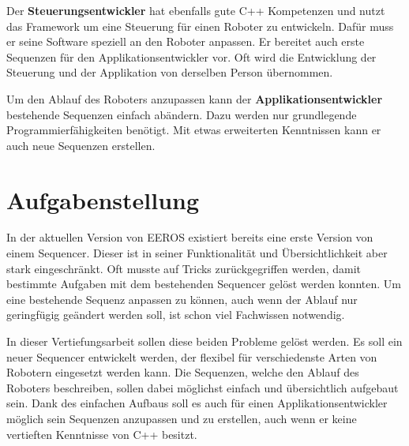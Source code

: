 Der \textbf{Steuerungsentwickler} hat ebenfalls gute C++ Kompetenzen und nutzt das Framework um eine Steuerung für einen Roboter zu entwickeln.
Dafür muss er seine Software speziell an den Roboter anpassen.
Er bereitet auch erste Sequenzen für den Applikationsentwickler vor.
Oft wird die Entwicklung der Steuerung und der Applikation von derselben Person übernommen.

Um den Ablauf des Roboters anzupassen kann der \textbf{Applikationsentwickler} bestehende Sequenzen einfach abändern.
Dazu werden nur grundlegende Programmierfähigkeiten benötigt.
Mit etwas erweiterten Kenntnissen kann er auch neue Sequenzen erstellen.



\section{Aufgabenstellung}
In der aktuellen Version von EEROS existiert bereits eine erste Version von einem Sequencer.
Dieser ist in seiner Funktionalität und Übersichtlichkeit aber stark eingeschränkt.
Oft musste auf Tricks zurückgegriffen werden, damit bestimmte Aufgaben mit dem bestehenden Sequencer gelöst werden konnten.
Um eine bestehende Sequenz anpassen zu können, auch wenn der Ablauf nur geringfügig geändert werden soll, ist schon viel Fachwissen notwendig.

In dieser Vertiefungsarbeit sollen diese beiden Probleme gelöst werden.
Es soll ein neuer Sequencer entwickelt werden, der flexibel für verschiedenste Arten von Robotern eingesetzt werden kann.
Die Sequenzen, welche den Ablauf des Roboters beschreiben, sollen dabei möglichst einfach und übersichtlich aufgebaut sein.
Dank des einfachen Aufbaus soll es auch für einen Applikationsentwickler möglich sein Sequenzen anzupassen und zu erstellen, auch wenn er keine vertieften Kenntnisse von C++ besitzt.

